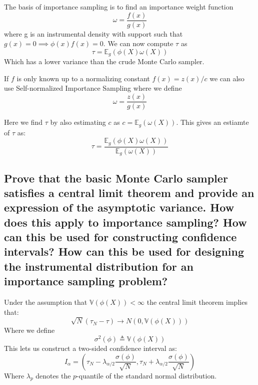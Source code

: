 \documentclass[a4paper]{article}
\begin{document}
The basis of importance sampling is to find an importance weight function \begin{equation}
    \omega = \frac{f(x)}{g(x)}
\end{equation}
where g is an instrumental density with support such that $g(x) = 0 \implies \phi(x)f(x) = 0$. We can now compute $\tau$ as 
\begin{equation}
    \tau = \mathbb{E}_g(\phi(X)\omega(X))
\end{equation}
Which has a lower variance than the crude Monte Carlo sampler.

If $f$ is only known up to a normalizing constant $f(x) = z(x)/c$ we can also use Self-normalized Importance Sampling where we define
\begin{equation}
    \omega = \frac{z(x)}{g(x)}
\end{equation}

Here we find $\tau$ by also estimating $c$ as $c = \mathbb{E}_g(\omega(X))$. This gives an estiamte of $\tau$ as:
\begin{equation}
    \tau = \frac{\mathbb{E}_g(\phi(X)\omega(X))}{\mathbb{E}_g(\omega(X))}
\end{equation}

\newpage
\subsection[The Central Limit Theorem for Monte Carlo]{Prove that the basic Monte Carlo sampler satisfies a central limit theorem and provide an expression of the asymptotic variance. How does this apply to importance sampling? How can this be used for constructing confidence intervals? How can this be used for designing the
instrumental distribution for an importance sampling problem?}

Under the assumption that $\mathbb{V}(\phi(X)) < \infty$ the central limit theorem implies that:
\begin{equation}
    \sqrt{N}(\tau_N-\tau) \rightarrow N(0,\mathbb{V}(\phi(X)))
\end{equation}
Where we define
\begin{equation}
    \sigma^2(\phi) \triangleq \mathbb{V}(\phi(X))
\end{equation}
This lets us construct a two-sided confidence interval as:
\begin{equation}
    I_\alpha = (\tau_N - \lambda_{\alpha/2}\frac{\sigma(\phi)}{\sqrt{N}}, \tau_N + \lambda_{\alpha/2}\frac{\sigma(\phi)}{\sqrt{N}})
\end{equation}
Where $\lambda_p$ denotes the $p$-quantile of the standard normal distribution.
\end{document}
